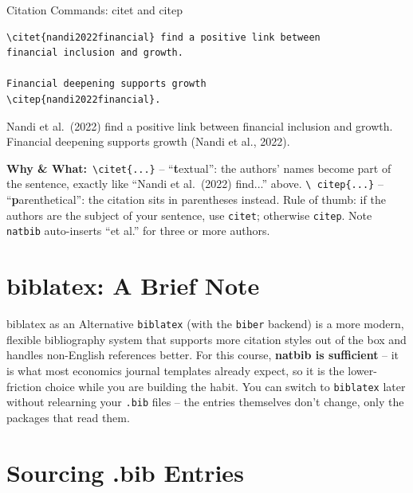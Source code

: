 \documentclass[11pt,aspectratio=169]{beamer}
\newcommand{\whybox}[1]{%
  \vspace{2pt}
  {\scriptsize\raggedright\textcolor{red!55!black}{\textbf{Why \& What:}}~#1\par}
}
\begin{document}
\begin{frame}[fragile]{Citation Commands: citet and citep}
  \begin{lstlisting}
\citet{nandi2022financial} find a positive link between
financial inclusion and growth.

Financial deepening supports growth
\citep{nandi2022financial}.
  \end{lstlisting}
  \begin{outputbox}
    \small
    Nandi et al.\ (2022) find a positive link between financial
    inclusion and growth.\\[6pt]
    Financial deepening supports growth (Nandi et al., 2022).
  \end{outputbox}
  \whybox{\texttt{\textbackslash citet\{...\}} -- ``\textbf{t}extual'':
  the authors' names become part of the sentence, exactly like ``Nandi
  et al.\ (2022) find...'' above. \texttt{\textbackslash
  citep\{...\}} -- ``\textbf{p}arenthetical'': the citation sits in
  parentheses instead. Rule of thumb: if the authors are the subject of
  your sentence, use \texttt{citet}; otherwise \texttt{citep}. Note
  \texttt{natbib} auto-inserts ``et al.'' for three or more authors.}
\end{frame}

\section{biblatex: A Brief Note}

\begin{frame}{biblatex as an Alternative}
  \small
  \texttt{biblatex} (with the \texttt{biber} backend) is a more modern,
  flexible bibliography system that supports more citation styles out
  of the box and handles non-English references better. For this
  course, \textbf{natbib is sufficient} -- it is what most economics
  journal templates already expect, so it is the lower-friction choice
  while you are building the habit. You can switch to
  \texttt{biblatex} later without relearning your \texttt{.bib} files
  -- the entries themselves don't change, only the packages that read
  them.
\end{frame}

\section{Sourcing .bib Entries}
\end{document}
